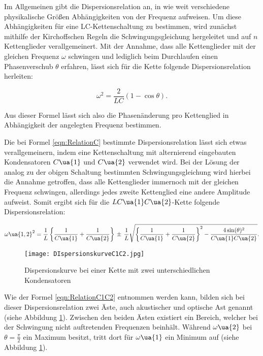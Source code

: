 Im Allgemeinen gibt die Dispersionsrelation an, in wie weit verschiedene physikalische
Größen Abhängigkeiten von der Frequenz aufweisen. Um diese Abhängigkeiten für
eine LC-Kettenschaltung zu bestimmen, wird zunächst mithilfe der Kirchoffschen
Regeln die Schwingungsgleichung hergeleitet und auf $n$ Kettenglieder verallgemeinert.
Mit der Annahme, dass alle Kettenglieder mit der gleichen Frequenz $\omega$ schwingen
und lediglich beim Durchlaufen einen Phasenverschub $\theta$ erfahren, lässt sich
für die Kette folgende Dispersionsrelation herleiten:

\begin{equation}
  \omega^2 = \frac{2}{LC}(1-\cos{\theta}) .
  \label{eqn:RelationC}
\end{equation}

Aus dieser Formel lässt sich also die Phasenänderung pro Kettenglied in Abhängigkeit
der angelegten Frequenz bestimmen.

Die bei Formel \eqref{eqn:RelationC} bestimmte Dispersionsrelation lässt
sich etwas verallgemeinern, indem eine Kettenschaltung  mit alternierend eingebauten
Kondensatoren $C\ua{1}$ und $C\ua{2}$ verwendet wird. Bei der Lösung der analog
zu der obigen Schaltung bestimmten Schwingungsgleichung wird hierbei die Annahme
getroffen, dass alle Kettenglieder immernoch mit der gleichen Frequenz schwingen,
allerdings jedes zweite Kettenglied eine andere Amplitude aufweist. Somit ergibt
sich für die $LC\ua{1}C\ua{2}$-Kette folgende Dispersionsrelation:

\begin{equation}
  \omega\ua{1,2}^2 = \frac{1}{L} \left\{ \frac{1}{C\ua{1}} + \frac{1}{C\ua{2}}
  \right\} \, \pm \, \frac{1}{L} \sqrt{ \left\{ \frac{1}{C\ua{1}} + \frac{1}{C\ua{2}}
  \right\}^2  - \frac{4\sin(\theta)^2}{C\ua{1}C\ua{2}}} .
  \label{eqn:RelationC1C2}
\end{equation}

\begin{figure}
  \texttt{[image: DIspersionskurveC1C2.jpg]}
  \caption{Dispersionskurve bei einer Kette mit zwei unterschiedlichen Kondensatoren \cite{anleitung01}}
  \label{fig:RelationC12}
\end{figure}

Wie der Formel \eqref{eqn:RelationC1C2} entnommen werden kann, bilden sich bei
dieser Dispersionsrelation zwei Äste, auch akustischer und optische Ast genannt
(siehe Abbildung \ref{fig:RelationC12}). Zwischen den beiden Ästen existiert ein Bereich, welcher
bei der Schwingung nicht auftretenden Frequenzen beinhält. Während $\omega\ua{2}$
bei $\theta = \frac{\pi}{2}$ ein Maximum besitzt, tritt dort für $\omega\ua{1}$
ein Minimum auf (siehe Abbildung \ref{fig:RelationC12}).


